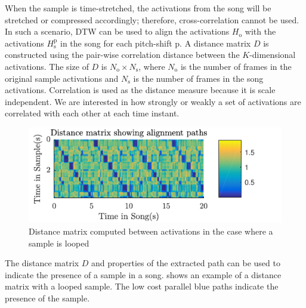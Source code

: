 \documentclass{article}
\begin{document}
When the sample is time-stretched, the activations from the song will be stretched or compressed accordingly; therefore, cross-correlation cannot be used.
%
In such a scenario, DTW can be used to align the activations $H_\mathrm{o}$ with the activations $H_{\mathrm{s}}^{\mathrm{p}}$ in the song for each pitch-shift $\mathrm{p}$. A distance matrix $D$ is constructed using the pair-wise correlation distance between the $K$-dimensional activations. The size of $D$ is $N_\mathrm{o}\times N_\mathrm{s}$, where $N_\mathrm{o}$ is the number of frames in the original sample activations and $N_\mathrm{s}$ is the number of frames in the song activations. Correlation is used as the distance measure because it is scale independent. We are interested in how strongly or weakly a set of activations are correlated with each other at each time instant.
\begin{figure}[t]
\centering
\includegraphics[width=\linewidth]{distmat.pdf}
\caption{Distance matrix computed between activations in the case where a sample is looped}
\label{fig2}
\end{figure}
The distance matrix $D$ and properties of the extracted path can be used to indicate the presence of a sample in a song.  shows an example of a distance matrix with a looped sample. The low cost parallel blue paths indicate the presence of the sample. 
\end{document}
